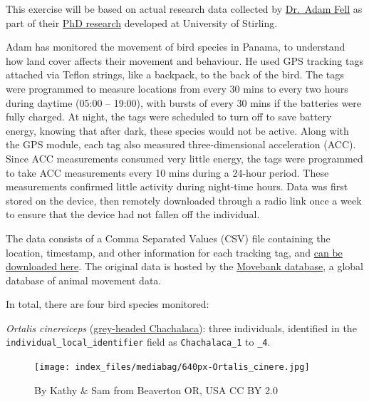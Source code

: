\documentclass[
  letterpaper,
  DIV=11,
  numbers=noendperiod]{scrreprt}
\begin{document}
This exercise will be based on actual research data collected by
\href{https://www.stir.ac.uk/people/1457157}{Dr.~Adam Fell} as part of
their \href{https://dspace.stir.ac.uk/handle/1893/36203}{PhD research}
developed at University of Stirling.

Adam has monitored the movement of bird species in Panama, to understand
how land cover affects their movement and behaviour. He used GPS
tracking tags attached via Teflon strings, like a backpack, to the back
of the bird. The tags were programmed to measure locations from every 30
mins to every two hours during daytime (05:00 -- 19:00), with bursts of
every 30 mins if the batteries were fully charged. At night, the tags
were scheduled to turn off to save battery energy, knowing that after
dark, these species would not be active. Along with the GPS module, each
tag also measured three-dimensional acceleration (ACC). Since ACC
measurements consumed very little energy, the tags were programmed to
take ACC measurements every 10 mins during a 24-hour period. These
measurements confirmed little activity during night-time hours. Data was
first stored on the device, then remotely downloaded through a radio
link once a week to ensure that the device had not fallen off the
individual.

The data consists of a Comma Separated Values (CSV) file containing the
location, timestamp, and other information for each tracking tag, and
\href{https://stir-my.sharepoint.com/:u:/g/personal/ala2_stir_ac_uk/EeG76lKhlLRNjQgGBJOIJYoBxn0ZWhxwjQOhnFiB0LFejQ?e=mZ4qmR}{can
be downloaded here}. The original data is hosted by the
\href{https://www.movebank.org/cms/webapp?gwt_fragment=page=studies,path=study2074159777}{Movebank
database}, a global database of animal movement data.

In total, there are four bird species monitored:

\emph{Ortalis cinereiceps}
(\href{https://en.wikipedia.org/wiki/Grey-headed_chachalaca}{grey-headed
Chachalaca}): three individuals, identified in the
\texttt{individual\_local\_identifier} field as \texttt{Chachalaca\_1}
to \texttt{\_4}.

\begin{figure}[H]

{\centering \texttt{[image: index\_files/mediabag/640px-Ortalis\_cinere.jpg]}

}

\caption{By Kathy \& Sam from Beaverton OR, USA CC BY 2.0}

\end{figure}%
\end{document}
